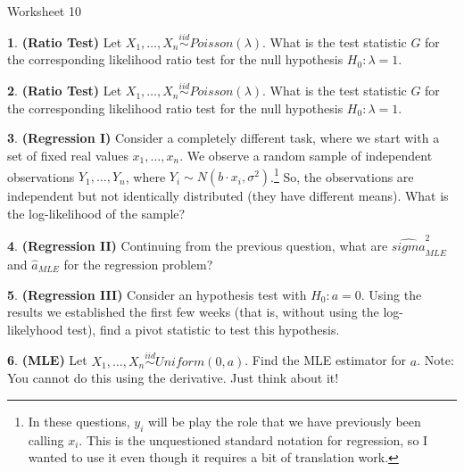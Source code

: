 \documentclass{tufte-handout}
\newcommand{\iid}{\stackrel{iid}{\sim}}
\begin{document}
\justify

{\LARGE Worksheet 10}

\vspace*{18pt}


\textbf{1}. \textbf{(Ratio Test)} Let $X_1, \ldots, X_n \iid Poisson(\lambda)$.
What is the test statistic $G$ for the corresponding likelihood 
ratio test for the null hypothesis $H_0: \lambda = 1$.

\textbf{2}. \textbf{(Ratio Test)} Let $X_1, \ldots, X_n \iid Poisson(\lambda)$.
What is the test statistic $G$ for the corresponding likelihood 
ratio test for the null hypothesis $H_0: \lambda = 1$.

\textbf{3}. \textbf{(Regression I)} Consider a completely different task, where we start
with a set of fixed real values $x_1, \ldots, x_n$. We observe a random
sample of independent observations $Y_1, \ldots, Y_n$, where
$Y_i \sim N(b \cdot x_i, \sigma^2)$.\footnote{
  In these questions, $y_i$ will be play the role that we have previously
  been calling $x_i$. This is the unquestioned standard notation for regression,
  so I wanted to use it even though it requires a bit of translation work.
} So, the observations are independent but not identically distributed (they
have different means). What is the log-likelihood of the sample?

\textbf{4}. \textbf{(Regression II)} Continuing from the previous question, what are
$\hat{sigma}_{MLE}^2$ and $\hat{a}_{MLE}$ for the regression problem?

\textbf{5}. \textbf{(Regression III)} Consider an hypothesis test with $H_0: a = 0$. 
Using the results we established the first few weeks (that is, without using the
log-likelyhood test), find a pivot statistic to test this hypothesis. 

\textbf{6}. \textbf{(MLE)} Let $X_1, \ldots, X_n \iid Uniform(0, a)$. Find the MLE estimator
for $a$. Note: You cannot do this using the derivative. Just think about it!
\end{document}
